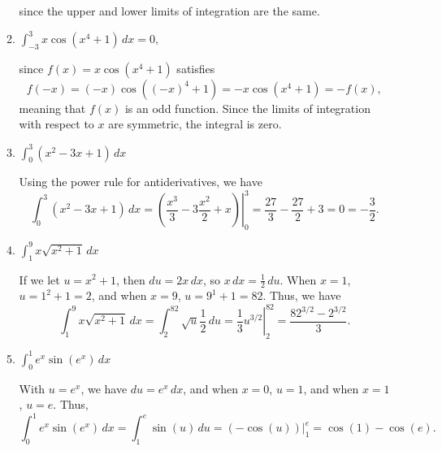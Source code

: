 \documentclass[12pt]{article}
\newcommand{\di}{\displaystyle}
\begin{document}
\begin{enumerate}
\begin{enumerate}
since the upper and lower limits of integration are the same.

\medskip

 \item $\di \int_{-3}^3 x\cos(x^4+1)\,dx = 0,$

since $f(x)=x\cos(x^4+1)$ satisfies 
\[
 f(-x) = (-x)\cos((-x)^4+1) = -x\cos(x^4+1)=-f(x),
\]
 meaning that $f(x)$ is an odd function. Since the limits of integration with respect to $x$ are symmetric, the integral is zero.

\medskip


 \item $\di \int_0^3 (x^2-3x+1)\,dx$

\medskip 

Using the power rule for antiderivatives, we have
\[
 \int_0^3 (x^2-3x+1)\,dx = \left.\left(\frac{x^3}{3}-3\frac{x^2}{2}+x\right)\right|_0^3 = \frac{27}{3}-\frac{27}{2}+3=0 = -\frac{3}{2}.
\]

\medskip

 \item $\di \int_1^9 x\sqrt{x^2+1}\,dx$

\medskip

If we let $u=x^2+1$, then $du = 2x\,dx$, so $x\,dx = \frac{1}{2}\,du$. When $x=1$, $u=1^2+1=2$, and when $x=9$, $u=9^1+1=82$. Thus, we have
\[
 \int_1^9x\sqrt{x^2+1}\,dx = \int_2^{82}\sqrt{u}\frac{1}{2}\,du = \left.\frac{1}{3}u^{3/2}\right|_2^{82} = \frac{82^{3/2}-2^{3/2}}{3}.
\]

\medskip

 \item $\di \int_0^1 e^x\sin(e^x)\,dx$

\medskip

 With $u=e^x$, we have $du=e^x\,dx$, and when $x=0$, $u=1$, and when $x=1$, $u=e$. Thus,
\[
 \int_0^1e^x\sin(e^x)\,dx = \int_1^e \sin(u)\,du = \left.(-\cos(u))\right|_1^e = \cos(1)-\cos(e).
\]

\end{enumerate}


\end{enumerate}
 
\end{document}

